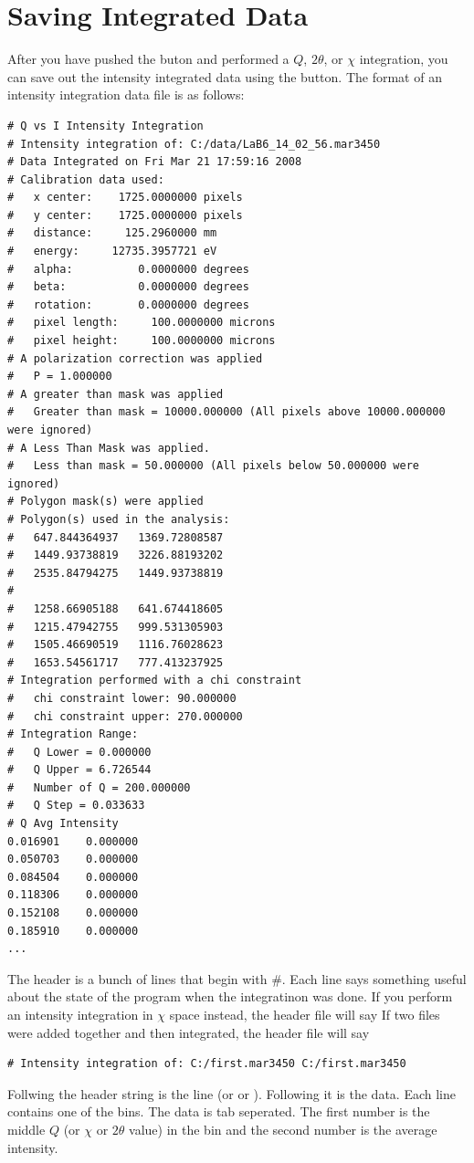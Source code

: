 \section{Saving Integrated Data}

After you have pushed the  buton
and performed a $Q$, $2\theta$, or $\chi$ integration,
you can save out the intensity integrated data
using the  button. The format of 
an intensity integration data file is as follows:
\begin{lstlisting}[caption={'A Cake Data File'}]
# Q vs I Intensity Integration
# Intensity integration of: C:/data/LaB6_14_02_56.mar3450 
# Data Integrated on Fri Mar 21 17:59:16 2008
# Calibration data used:
#   x center:    1725.0000000 pixels
#   y center:    1725.0000000 pixels
#   distance:     125.2960000 mm
#   energy:     12735.3957721 eV
#   alpha:          0.0000000 degrees
#   beta:           0.0000000 degrees
#   rotation:       0.0000000 degrees
#   pixel length:     100.0000000 microns
#   pixel height:     100.0000000 microns
# A polarization correction was applied
#   P = 1.000000
# A greater than mask was applied
#   Greater than mask = 10000.000000 (All pixels above 10000.000000 were ignored)
# A Less Than Mask was applied.
#   Less than mask = 50.000000 (All pixels below 50.000000 were ignored)
# Polygon mask(s) were applied
# Polygon(s) used in the analysis:
#   647.844364937	1369.72808587
#   1449.93738819	3226.88193202
#   2535.84794275	1449.93738819
#
#   1258.66905188	641.674418605
#   1215.47942755	999.531305903
#   1505.46690519	1116.76028623
#   1653.54561717	777.413237925
# Integration performed with a chi constraint
#   chi constraint lower: 90.000000
#   chi constraint upper: 270.000000
# Integration Range:
#   Q Lower = 0.000000
#   Q Upper = 6.726544
#   Number of Q = 200.000000
#   Q Step = 0.033633
# Q	Avg Intensity
0.016901	0.000000
0.050703	0.000000
0.084504	0.000000
0.118306	0.000000
0.152108	0.000000
0.185910	0.000000
...
\end{lstlisting}
The header is a bunch of lines that begin with \#.
Each line says something useful about the state
of the program when the integratinon was
done. 
If you perform an intensity integration in $\chi$
space instead, the header file will say
If two files were added together
and then integrated, the header file will say
\begin{lstlisting}[caption={'Alternate Header'}]
# Intensity integration of: C:/first.mar3450 C:/first.mar3450
\end{lstlisting}
Follwing the header string is the line
 (or 
or ). Following it is
the data. Each line contains one of the bins. The data
is tab seperated. The first number is the middle $Q$ (or
$\chi$ or $2\theta$ value) in the bin and the second number
is the average intensity.



